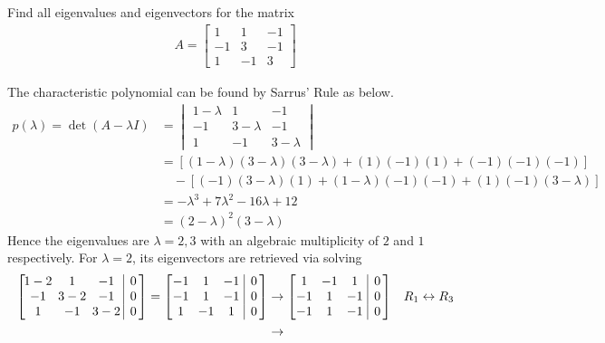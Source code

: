 \begin{exmp}
\label{exmp:2geomul}
Find all eigenvalues and eigenvectors for the matrix
\begin{align*}
A = \begin{bmatrix}
1 & 1 & -1 \\
-1 & 3 & -1 \\
1 & -1 & 3
\end{bmatrix}
\end{align*}
\end{exmp}
\begin{solution}
The characteristic polynomial can be found by Sarrus' Rule as below.
\begin{align*}
p(\lambda) = \det(A-\lambda I) &= \begin{vmatrix}
1-\lambda & 1 & -1 \\
-1 & 3-\lambda & -1 \\
1 & -1 & 3-\lambda
\end{vmatrix} \\
&= [(1-\lambda)(3-\lambda)(3-\lambda) + (1)(-1)(1) + (-1)(-1)(-1)] \\
&\quad - [(-1)(3-\lambda)(1) + (1-\lambda)(-1)(-1) + (1)(-1)(3-\lambda)]\\
&= -\lambda^3 + 7\lambda^2 - 16\lambda + 12 \\
&= (2-\lambda)^2(3-\lambda)
\end{align*}
Hence the eigenvalues are $\lambda = 2,3$ with an algebraic multiplicity of $2$ and $1$ respectively. For $\lambda = 2$, its eigenvectors are retrieved via solving
\begin{align*}
\left[\begin{array}{@{\,}wc{17pt}wc{17pt}wc{17pt}|c@{\,}}
1-2 & 1 & -1 & 0 \\
-1 & 3-2 & -1 & 0 \\
1 & -1 & 3-2 & 0
\end{array}\right]
=
\left[\begin{array}{@{\,}wc{10pt}wc{10pt}wc{10pt}|c@{\,}}
-1 & 1 & -1 & 0 \\
-1 & 1 & -1 & 0 \\
1 & -1 & 1 & 0
\end{array}\right] 
&\to
\left[\begin{array}{@{\,}wc{10pt}wc{10pt}wc{10pt}|c@{\,}}
1 & -1 & 1 & 0 \\
-1 & 1 & -1 & 0 \\
-1 & 1 & -1 & 0 
\end{array}\right] & R_1 \leftrightarrow R_3 \\
&\to

\end{align*}
\end{solution}
